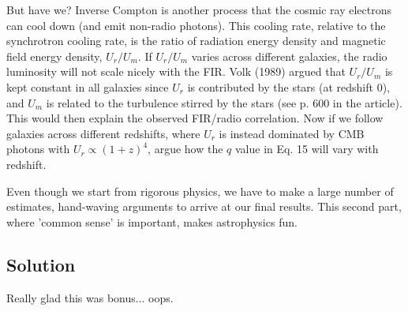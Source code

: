\documentclass[12pt]{article}
\begin{document}
But have we? Inverse Compton is another process that the cosmic ray electrons can cool down (and emit non-radio photons). This cooling rate, relative to the synchrotron cooling rate, is the ratio of radiation energy density and magnetic field energy density, $U_r/U_m$. If $U_r/U_m$ varies across different galaxies, the radio luminosity will not scale nicely with the FIR. Volk (1989) argued that $U_r/U_m$ is kept constant in all galaxies since $U_r$ is contributed by the stars (at redshift 0), and $U_m$ is related to the turbulence stirred by the stars (see p. 600 in the article). This would then explain the observed FIR/radio correlation. Now if we follow galaxies across different redshifts, where $U_r$ is instead dominated by CMB photons with $U_r \propto (1+z)^4$, argue how the $q$ value in Eq. 15 will vary with redshift.

Even though we start from rigorous physics, we have to make a large number of estimates, hand-waving arguments to arrive at our final results. This second part, where 'common sense' is important, makes astrophysics fun.


\subsection*{Solution}

Really glad this was bonus... oops.
\end{document}
